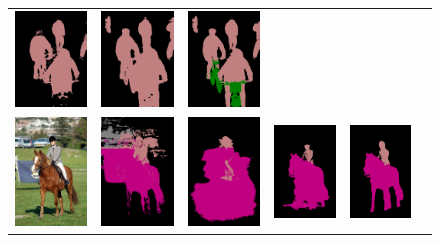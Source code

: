 \begin{figure}[!htbp]
{\begin{tabular}{c c c c c c}
    \includegraphics[height=0.13\linewidth]{fig/val_crf_vis/bbox_crf/2007_001630.png} &
    \includegraphics[height=0.13\linewidth]{fig/val_crf_vis/strongweak/2007_001630.png} &
    \includegraphics[height=0.13\linewidth]{fig/val_crf_vis/cocomix/2007_001630.png} \\
    \includegraphics[height=0.15\linewidth]{fig/val_crf_vis/img/2007_005331.jpg} &
    \includegraphics[height=0.15\linewidth]{fig/val_crf_vis/adaweak/2007_005331.png} &
    \includegraphics[height=0.15\linewidth]{fig/val_crf_vis/bbox/2007_005331.png} &
    \includegraphics[height=0.15\linewidth]{fig/val_crf_vis/bbox_crf/2007_005331.png} &
    \includegraphics[height=0.15\linewidth]{fig/val_crf_vis/strongweak/2007_005331.png} &

\end{tabular}}
\end{figure}
